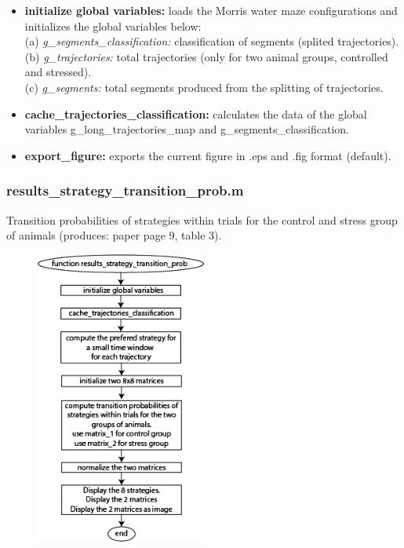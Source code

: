 \documentclass[12pt,titlepage]{article}
\begin{document}
\begin{doublespace}
\begin{itemize}
	\item\textbf{initialize global variables:} loads the Morris water maze configurations and initializes the global variables below:\\
	(a) \textit{g\_segments\_classification:} classification of segments (splited trajectories).\\
	(b) \textit{g\_trajectories:} total trajectories (only for two animal groups, controlled and stressed).\\
	(c) \textit{g\_segments:} total segments produced from the splitting of trajectories.
	\item\textbf{cache\_trajectories\_classification:}  calculates the data of the global variables g\_long\_trajectories\_map and g\_segments\_classification.
	\item\textbf{export\_figure:} exports the current figure in .eps and .fig format (default).
\end{itemize}

\subsubsection{results\_strategy\_transition\_prob.m}
Transition probabilities of strategies within trials for the control and stress group of animals (produces: paper page 9, table 3).

\begin{figure}[H]
	\begin{center}
		\includegraphics[width=0.5\textwidth]{diagram_strategy_transition_prob.jpg}
		\label{table3}
	\end{center}
\end{figure}


\end{doublespace}
\end{document}
